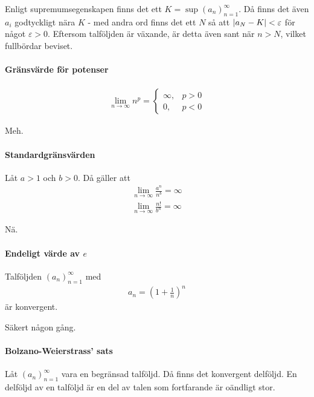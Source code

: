 \proof
Enligt supremumsegenskapen finns det ett $K = \sup{\left(a_n\right)_{n = 1}^\infty}$. Då finns det även $a_i$ godtyckligt nära $K$ - med andra ord finns det ett $N$ så att $\abs{a_N - K} < \varepsilon$ för något $\varepsilon > 0$. Eftersom talföljden är växande, är detta även sant när $n > N$, vilket fullbördar beviset.

\paragraph{Gränsvärde för potenser}
\begin{align*}
	\lim_{n\to\infty} n^p =
	\begin{cases}
		\infty, & p > 0\\
		0,      & p < 0
	\end{cases}
\end{align*}

\proof
Meh.

\paragraph{Standardgränsvärden}
Låt $a > 1$ och $b > 0$. Då gäller att
\begin{align*}
	\lim_{n\to\infty}\frac{a^n}{n^b} = \infty \\
	\lim_{n\to\infty}\frac{n!}{b^n} = \infty
\end{align*}

\proof
Nä.

\paragraph{Endeligt värde av $e$}
Talföljden $\left(a_n\right)_{n = 1}^\infty$ med
\begin{align*}
	a_n = \left(1 + \frac{1}{n}\right)^{n}
\end{align*}
är konvergent.

\proof
Säkert någon gång.

\paragraph{Bolzano-Weierstrass' sats}
Låt $\left(a_n\right)_{n = 1}^\infty$ vara en begränsad talföljd. Då finns det konvergent delföljd. En delföljd av en talföljd är en del av talen som fortfarande är oändligt stor.